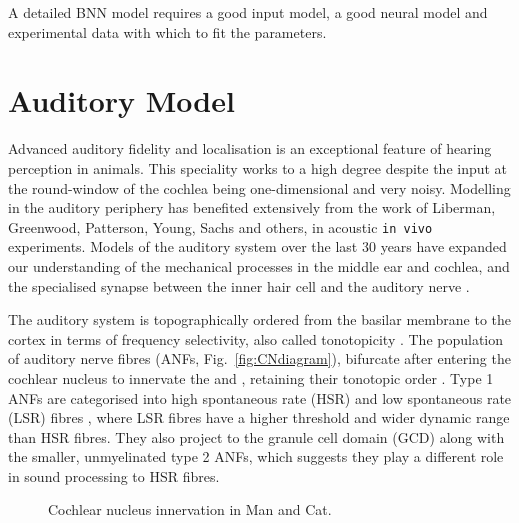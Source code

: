 \smallskip{}

A detailed BNN model requires a good input model, a good neural model and experimental
data with which to fit the parameters.  

\section{Auditory Model}\label{sec:CN:auditory-model}

Advanced auditory fidelity and localisation is an exceptional feature
of hearing perception in animals.  This speciality works to a high
degree despite the input at the round-window of the cochlea being
one-dimensional and very noisy.  Modelling in the auditory periphery
has benefited extensively from the work of Liberman, Greenwood,
Patterson, Young, Sachs and others, in acoustic \texttt{in vivo}
experiments. Models of the auditory system over the last 30 years have
expanded our understanding of the mechanical processes in the middle
ear and cochlea, and the specialised synapse between the inner hair
cell and the auditory nerve
\citep{DavisVoigt:1991,Carney:1993,MeddisHewittEtAl:1990}.

\smallskip{}

The auditory system is topographically ordered from the basilar membrane to the
cortex in terms of frequency selectivity, also called tonotopicity
\citep{YoungOertel:2004}.  The population of auditory nerve fibres (ANFs,
Fig.~\ref{fig:CNdiagram}), bifurcate after entering the cochlear nucleus to
innervate the \VCN and \DCN\@, retaining their tonotopic order
\citep{Lorente:1981, Liberman:1982, Liberman:1993}. Type 1 ANFs are categorised
into high spontaneous rate (HSR) and low spontaneous rate (LSR) fibres
\citep{Liberman:1978}, where LSR fibres have a higher threshold and wider
dynamic range than HSR fibres. They also project to the granule cell domain
(GCD) \citep{RyugoParks:2003, RyugoHaenggeliEtAl:2003} along with the smaller,
unmyelinated type 2 ANFs, which suggests they play a different role in sound
processing to HSR fibres.

\smallskip{}

\begin{figure}[tbh]
  \begin{center}
    \caption{Cochlear nucleus innervation in Man and Cat. \citep[!find out which publication printed this!]{RyugoParks:2003,Ryugo:1992,Spoendlin:1973}}
    \label{fig:CN_Cat_Human}
  \end{center}
\end{figure}


